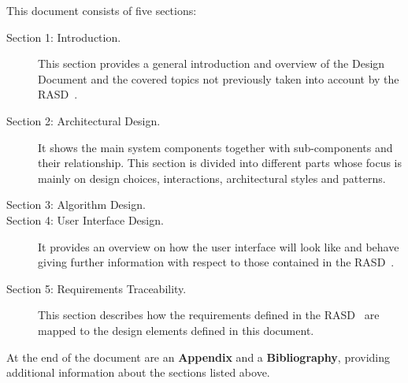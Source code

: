 This document consists of five sections:

\begin{description}
\item[Section 1: Introduction.] This section provides a general introduction and overview of the Design Document and the covered topics not previously taken into account by the RASD~\cite{rasd}.
\item[Section 2: Architectural Design.] It shows the main system components together with sub-components and their relationship. This section is divided into different parts whose focus is mainly on design choices, interactions, architectural styles and patterns.
\item[Section 3: Algorithm Design.]
\item[Section 4: User Interface Design.] It provides an overview on how the user interface will look like and behave giving further information with respect to those contained in the RASD~\cite{rasd}.
\item[Section 5: Requirements Traceability.] This section describes how the requirements defined in the RASD~\cite{rasd} are mapped to the design elements defined in this document.
\end{description}
At the end of the document are an \textbf{Appendix} and a \textbf{Bibliography}, providing additional information about the sections listed above.